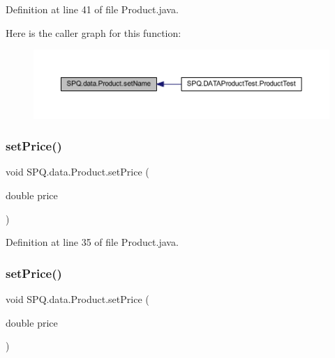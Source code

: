 Definition at line 41 of file Product.\+java.

Here is the caller graph for this function\+:
\nopagebreak
\begin{figure}[H]
\begin{center}
\leavevmode
\includegraphics[width=350pt]{class_s_p_q_1_1data_1_1_product_a257a5e290694db0588a9ac9aad598360_icgraph}
\end{center}
\end{figure}
\mbox{\label{class_s_p_q_1_1data_1_1_product_a6a12ed828fa7745b6bc8f5f2bc5dd014}} 
\subsubsection{\texorpdfstring{set\+Price()}{setPrice()}\hspace{0.1cm}{\footnotesize\ttfamily [1/2]}}
{\footnotesize\ttfamily void S\+P\+Q.\+data.\+Product.\+set\+Price (\begin{DoxyParamCaption}\item[{double}]{price }\end{DoxyParamCaption})}



Definition at line 35 of file Product.\+java.

\mbox{\label{class_s_p_q_1_1data_1_1_product_a6a12ed828fa7745b6bc8f5f2bc5dd014}} 
\subsubsection{\texorpdfstring{set\+Price()}{setPrice()}\hspace{0.1cm}{\footnotesize\ttfamily [2/2]}}
{\footnotesize\ttfamily void S\+P\+Q.\+data.\+Product.\+set\+Price (\begin{DoxyParamCaption}\item[{double}]{price }\end{DoxyParamCaption})}



